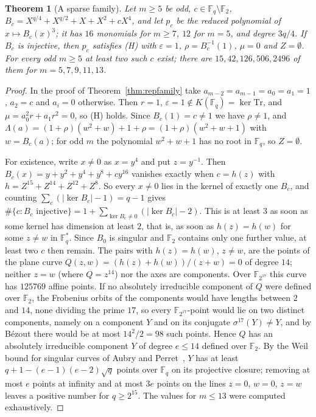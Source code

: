 \documentclass[11pt]{article}
\newtheorem{theorem}{Theorem}[section]
\theoremstyle{definition}
\theoremstyle{remark}
\newcommand{\F}{\mathbb{F}}
\newcommand{\Tr}{\mathrm{Tr}}
\begin{document}
\begin{theorem}[A sparse family]\label{thm:sparse}
Let $m\ge5$ be odd, $c\in\F_q\setminus\F_2$, $B_c=X^{q/4}+X^{q/2}+X+X^2+cX^4$, and let $p_c$ be the reduced polynomial of
$x\mapsto B_c(x)^3$; it has $16$ monomials for $m\ge7$, $12$ for $m=5$, and degree $3q/4$. If $B_c$ is injective, then
$p_c$ satisfies (H) with $\varepsilon=1$, $\rho=B_c^{-1}(1)$, $\mu=0$ and $Z=\emptyset$. For every odd $m\ge5$ at least two
such $c$ exist; there are $15,42,126,506,2496$ of them for $m=5,7,9,11,13$.
\end{theorem}
\begin{proof}
In the proof of Theorem~\ref{thm:repfamily} take $a_{m-2}=a_{m-1}=a_0=a_1=1$, $a_2=c$ and $a_i=0$ otherwise. Then
$r=1$, $\varepsilon=1\notin K(\F_q)=\ker\Tr$, and $\mu=a_0^2r+a_1r^2=0$, so (H) holds. Since $B_c(1)=c\ne1$ we have
$\rho\ne1$, and $\Lambda(a)=(1+\rho)(w^2+w)+1+\rho=(1+\rho)(w^2+w+1)$ with $w=B_c(a)$; for odd $m$ the polynomial $w^2+w+1$
has no root in $\F_q$, so $Z=\emptyset$.

For existence, write $x\ne0$ as $x=y^4$ and put $z=y^{-1}$. Then $B_c(x)=y+y^2+y^4+y^8+cy^{16}$ vanishes exactly when
$c=h(z)$ with $h=Z^{15}+Z^{14}+Z^{12}+Z^8$. So every $x\ne0$ lies in the kernel of exactly one $B_c$, and counting
$\sum_c(|\ker B_c|-1)=q-1$ gives $\#\{c:B_c\text{ injective}\}=1+\sum_{\ker B_c\ne0}(|\ker B_c|-2)$. This is at least $3$
as soon as some kernel has dimension at least $2$, that is, as soon as $h(z)=h(w)$ for some $z\ne w$ in $\F_q^*$. Since
$B_0$ is singular and $\F_2$ contains only one further value, at least two $c$ then remain. The pairs with $h(z)=h(w)$,
$z\ne w$, are the points of the plane curve $Q(z,w)=(h(z)+h(w))/(z+w)=0$ of degree $14$; neither $z=w$ (where
$Q=z^{14}$) nor the axes are components. Over $\F_{2^{17}}$ this curve has $125769$ affine points. If no absolutely
irreducible component of $Q$ were defined over $\F_2$, the Frobenius orbits of the components would have lengths
between $2$ and $14$, none dividing the prime $17$, so every $\F_{2^{17}}$-point would lie on two distinct components, namely on a component $Y$ and on its conjugate $\sigma^{17}(Y)\ne Y$,
and by Bézout there would be at most $14^2/2=98$ such points. Hence $Q$ has an absolutely irreducible component $Y$
of degree $e\le14$ defined over $\F_2$. By the Weil bound for singular curves of Aubry and Perret~\cite{AP},
$Y$ has at least $q+1-(e-1)(e-2)\sqrt q$ points over $\F_q$ on its projective closure; removing at most $e$ points at
infinity and at most $3e$ points on the lines $z=0$, $w=0$, $z=w$ leaves a positive number for $q\ge2^{15}$. The
values for $m\le13$ were computed exhaustively.
\end{proof}
\end{document}
